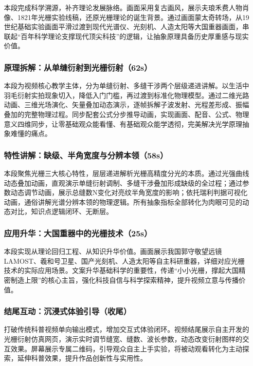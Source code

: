 \documentclass[12pt,a4paper]{ctexrep}
\begin{document}
本段完成科学溯源，补齐理论发展脉络。画面采用复古画风，展示夫琅禾费人物肖像、1821年光栅实验线稿，还原光栅理论的诞生背景。通过画面蒙太奇转场，从19世纪基础实验画面平滑过渡到现代光谱仪、光刻机、人造太阳等大国重器画面，串联起“百年科学理论支撑现代顶尖科技”的逻辑，让抽象原理具备历史厚重感与现实价值。

\subsubsection{原理拆解：从单缝衍射到光栅衍射（62s）}

本段为视频核心教学主体，分为单缝衍射、多缝干涉两个层级递进讲解。以生活中羽毛衍射实拍现象切入，降低入门门槛，再过渡到标准化物理模型。通过二维光路动画、三维光场演化、矢量叠加动态演示，逐帧拆解子波发射、光程差形成、振幅叠加的完整物理过程。同步配套公式分步推导动画，实现画面、配音、公式、物理意义四维同步，让零基础观众能看懂、有基础观众能学透彻，完美解决光学原理抽象难懂的痛点。

\subsubsection{特性讲解：缺级、半角宽度与分辨本领（58s）}

本段聚焦光栅三大核心特性，层层递进解析光栅高精度分光的本质。通过光强曲线动态叠加动画，直观演示单缝衍射调制、多缝干涉叠加形成缺级的全过程；通过参数动态调节动画，展示总缝数N变化对亮纹半角宽度的影响；依托瑞利判据可视化动画，通俗讲解光谱分辨本领的物理逻辑。所有抽象指标全部转化为肉眼可见的动态对比，知识点逻辑闭环、无断层。

\subsubsection{应用升华：大国重器中的光栅技术（25s）}

本段实现从理论回归工程、从知识升华价值。画面展示我国郭守敬望远镜LAMOST、羲和号卫星、国产光刻机、人造太阳等自主科研重器，详细对应光栅技术的实际应用场景。文案升华基础科学的重要性，传递“小小光栅，撑起大国精密制造上限”的核心主旨，强化科技自信与科学探索精神，提升视频立意与传播价值。

\subsubsection{结尾互动：沉浸式体验引导（收尾）}

打破传统科普视频单向输出模式，增加交互式体验闭环。视频结尾展示自主开发的光栅衍射仿真网页，演示实时调节缝宽、缝数、波长参数，动态改变衍射图样的交互效果。屏幕展示专属二维码，引导观众自主上手实验，将被动观看转化为主动探索，延伸科普效果，提升作品创新性与实用性。
\end{document}
